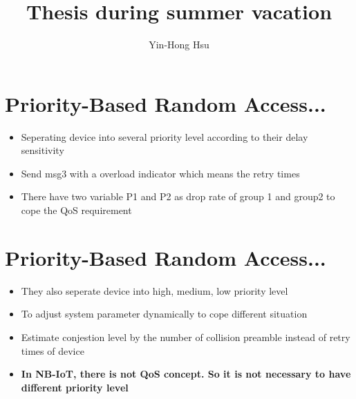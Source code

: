 \documentclass[journal]{IEEEtran}
\begin{document}
\title{Thesis during summer vacation}


\author{Yin-Hong Hsu}

\maketitle





%
\IEEEpeerreviewmaketitle
\section{Priority-Based Random Access... ~\cite{Zangar16}}
\begin{itemize}
    \item {Seperating device into several priority level according to their delay sensitivity} 
    \item {Send msg3 with a overload indicator which means the retry times}
    \item {There have two variable P1 and P2 as drop rate of group 1 and group2 to cope the QoS requirement}
\end{itemize}
\section{Priority-Based Random Access... ~\cite{Guan16}}
\begin{itemize}
    \item {They also seperate device into high, medium, low priority level} 
    \item {To adjust system parameter dynamically to cope different situation}
    \item {Estimate conjestion level by the number of collision preamble instead of retry times of device}
    \item \textbf{In NB-IoT, there is not QoS concept. So it is not necessary to have different priority level}
\end{itemize}
\end{document}
